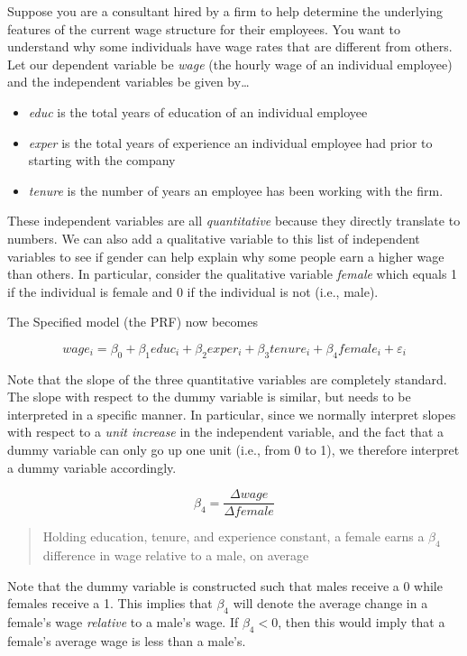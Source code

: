 \documentclass[
]{book}
\begin{document}
Suppose you are a consultant hired by a firm to help determine the underlying features of the current wage structure for their employees. You want to understand why some individuals have wage rates that are different from others. Let our dependent variable be \emph{wage} (the hourly wage of an individual employee) and the independent variables be given by\ldots{}

\begin{itemize}
\item
  \emph{educ} is the total years of education of an individual employee
\item
  \emph{exper} is the total years of experience an individual employee had prior to starting with the company
\item
  \emph{tenure} is the number of years an employee has been working with the firm.
\end{itemize}

These independent variables are all \emph{quantitative} because they directly translate to numbers. We can also add a qualitative variable to this list of independent variables to see if gender can help explain why some people earn a higher wage than others. In particular, consider the qualitative variable \emph{female} which equals 1 if the individual is female and 0 if the individual is not (i.e., male).

The Specified model (the PRF) now becomes

\[wage_i=\beta_0+\beta_1educ_i+\beta_2exper_i+\beta_3tenure_i+\beta_4female_i+\varepsilon_i\]

Note that the slope of the three quantitative variables are completely standard. The slope with respect to the dummy variable is similar, but needs to be interpreted in a specific manner. In particular, since we normally interpret slopes with respect to a \emph{unit increase} in the independent variable, and the fact that a dummy variable can only go up one unit (i.e., from 0 to 1), we therefore interpret a dummy variable accordingly.

\[\beta_4 = \frac{\Delta wage}{\Delta female}\]

\begin{quote}
Holding education, tenure, and experience constant, a female earns a \(\beta_4\) difference in wage relative to a male, on average
\end{quote}

Note that the dummy variable is constructed such that males receive a 0 while females receive a 1. This implies that \(\beta_4\) will denote the average change in a female's wage \emph{relative} to a male's wage. If \(\beta_4 < 0\), then this would imply that a female's average wage is less than a male's.
\end{document}
